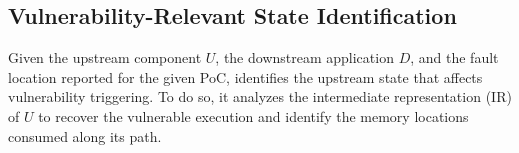 

\subsection{Vulnerability-Relevant State Identification}
\label{subsec:p1}

Given the upstream component $U$, the downstream application $D$, and
the fault location reported for the given PoC, \sys identifies the
upstream state that affects vulnerability triggering. To do so, it analyzes the
intermediate representation (IR) of $U$ to recover the vulnerable
execution and identify the memory locations consumed along its path.






